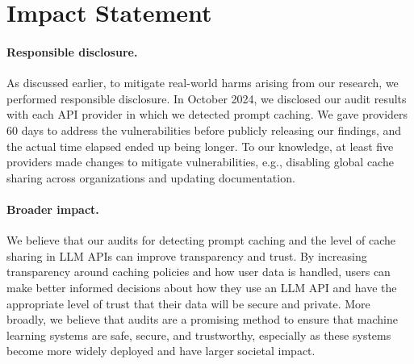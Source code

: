 \section*{Impact Statement}

\paragraph{Responsible disclosure.} As discussed earlier, to mitigate real-world harms arising from our research, we performed responsible disclosure. In October 2024, we disclosed our audit results with each API provider in which we detected prompt caching. We gave providers 60 days to address the vulnerabilities before publicly releasing our findings, and the actual time elapsed ended up being longer. To our knowledge, at least five providers made changes to mitigate vulnerabilities, e.g., disabling global cache sharing across organizations and updating documentation.

\paragraph{Broader impact.} We believe that our audits for detecting prompt caching and the level of cache sharing in LLM APIs can improve transparency and trust. By increasing transparency around caching policies and how user data is handled, users can make better informed decisions about how they use an LLM API and have the appropriate level of trust that their data will be secure and private. More broadly, we believe that audits are a promising method to ensure that machine learning systems are safe, secure, and trustworthy, especially as these systems become more widely deployed and have larger societal impact.
